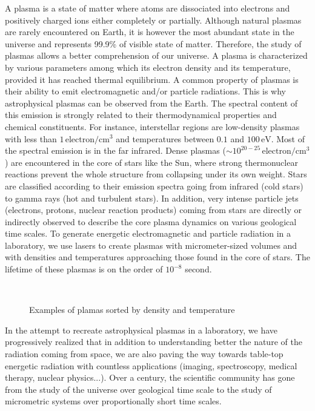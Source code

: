 A plasma is a state of matter where atoms are dissociated into electrons and positively charged ions either completely or partially. Although natural plasmas are rarely encountered on Earth, it is however the most abundant state in the universe and represents 99.9\% of visible state of matter. Therefore, the study of plasmas allows a better comprehension of our universe.  A plasma is characterized by various parameters among which its electron density and its temperature, provided it has reached thermal equilibrium. A common property of plasmas is their ability to emit electromagnetic and/or particle radiations. This is why astrophysical plasmas can be observed from the Earth. The spectral content of this emission is strongly related to their thermodynamical properties and chemical constituents. For instance, interstellar regions are  low-density plasmas  with less than $1\,\mathrm{electron/cm^3}$ and temperatures between $0.1$ and $100\,\mathrm{eV}$. Most of the spectral emission is in the far infrared. Dense plasmas ($\sim 10^{20-25}\,\mathrm{electron/cm^3}$) are encountered in the core of stars like the Sun, where strong thermonuclear reactions prevent the whole structure from collapsing under its own weight. Stars are classified according to their emission spectra going from infrared (cold stars) to gamma rays (hot and turbulent stars). In addition, very intense particle jets (electrons, protons, nuclear reaction products) coming from stars are directly or indirectly observed to describe the core plasma dynamics on various geological time scales. To generate energetic electromagnetic and particle  radiation in a laboratory, we use lasers to create plasmas with micrometer-sized volumes and with densities and temperatures approaching those found in the core of stars. The lifetime of these plasmas is on the order of $10^{-8}$ second.


\begin{figure}[H]
\begin{center}
\noindent{}\\
\caption{\label{fig:plasmaDiagrams} Examples of plamas sorted by density and temperature}
\end{center}
\end{figure}

\noindent In the attempt to recreate astrophysical plasmas in a laboratory, we have progressively realized that in addition to understanding better the nature of the radiation coming from space, we are also paving the way towards table-top energetic radiation with countless applications (imaging, spectroscopy, medical therapy, nuclear physics...). Over a century, the scientific community has gone from the study of the universe over geological time scale to the study of micrometric systems over proportionally short time scales.

